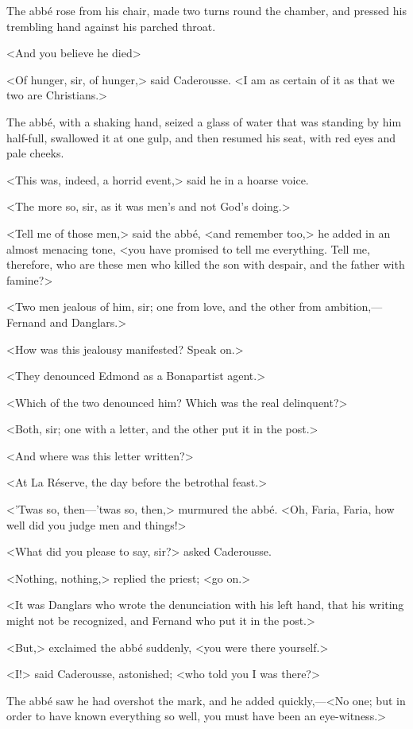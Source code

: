  The abbé rose from his chair, made two turns round the chamber, and pressed his trembling hand against his parched throat. 

 <And you believe he died\longdash> 

 <Of hunger, sir, of hunger,> said Caderousse. <I am as certain of it as that we two are Christians.> 

 The abbé, with a shaking hand, seized a glass of water that was standing by him half-full, swallowed it at one gulp, and then resumed his seat, with red eyes and pale cheeks. 

 <This was, indeed, a horrid event,> said he in a hoarse voice. 

 <The more so, sir, as it was men's and not God's doing.> 

 <Tell me of those men,> said the abbé, <and remember too,> he added in an almost menacing tone, <you have promised to tell me everything. Tell me, therefore, who are these men who killed the son with despair, and the father with famine?> 

 <Two men jealous of him, sir; one from love, and the other from ambition,—Fernand and Danglars.> 

 <How was this jealousy manifested? Speak on.> 

 <They denounced Edmond as a Bonapartist agent.> 

 <Which of the two denounced him? Which was the real delinquent?> 

 <Both, sir; one with a letter, and the other put it in the post.> 

 <And where was this letter written?> 

 <At La Réserve, the day before the betrothal feast.> 

 <'Twas so, then—'twas so, then,> murmured the abbé. <Oh, Faria, Faria, how well did you judge men and things!> 

 <What did you please to say, sir?> asked Caderousse. 

 <Nothing, nothing,> replied the priest; <go on.> 

 <It was Danglars who wrote the denunciation with his left hand, that his writing might not be recognized, and Fernand who put it in the post.> 

 <But,> exclaimed the abbé suddenly, <you were there yourself.> 

 <I!> said Caderousse, astonished; <who told you I was there?> 

 The abbé saw he had overshot the mark, and he added quickly,—<No one; but in order to have known everything so well, you must have been an eye-witness.> 

